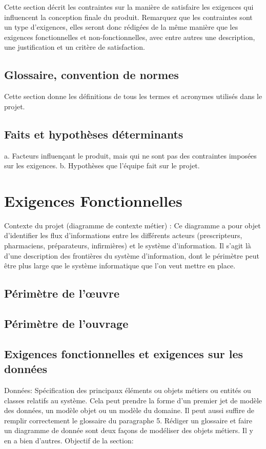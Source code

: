 		Cette section décrit les contraintes sur la manière de satisfaire les exigences qui influencent
la conception finale du produit. Remarquez que les contraintes sont un type d’exigences,
elles seront donc rédigées de la même manière que les exigences fonctionnelles et non-fonctionnelles, avec entre autres une description, une justification et un critère de
satisfaction.
		\subsection{Glossaire, convention de normes}
		
Cette section donne les définitions de tous les termes et acronymes utilisés dans le projet.
		\subsection{Faits et hypothèses déterminants}
		a. Facteurs influençant le produit, mais qui ne sont pas des contraintes imposées sur les
exigences.\newline
b. Hypothèses que l’équipe fait sur le projet.
	\section{Exigences Fonctionnelles}
	
Contexte du projet (diagramme de contexte métier) :\newline		 
Ce diagramme a pour objet d’identifier les flux d’informations entre les différents acteurs (prescripteurs, pharmaciens, préparateurs, infirmières) et le système d’information.
Il s’agit là d’une description des frontières du système d’information, dont le périmètre peut être plus large que le système informatique que l’on veut mettre en place.

		\subsection{Périmètre de l'œuvre}
		\subsection{Périmètre de l'ouvrage}

		\subsection{Exigences fonctionnelles et exigences sur les données}
		
Données: Spécification des principaux éléments ou objets métiers ou entités ou classes relatifs au
système. Cela peut prendre la forme d’un premier jet de modèle des données, un modèle
objet ou un modèle du domaine. Il peut aussi suffire de remplir correctement le glossaire du
paragraphe 5. Rédiger un glossaire et faire un diagramme de donnée sont deux façons de
modéliser des objets métiers. Il y en a bien d’autres. \newline
Objectif de la section:
